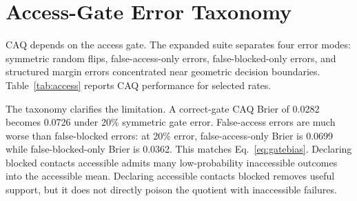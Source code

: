 \documentclass{article}
\begin{document}
\section{Access-Gate Error Taxonomy}
\label{sec:access}

CAQ depends on the access gate. The expanded suite separates four error modes: symmetric random flips, false-access-only errors, false-blocked-only errors, and structured margin errors concentrated near geometric decision boundaries. Table~\ref{tab:access} reports CAQ performance for selected rates.

\begin{table}[t]
\centering
\caption{Access-certificate errors for CAQ over 20 seeds. False-access errors are more damaging than false-blocked errors because inaccessible low-probability outcomes are incorrectly admitted into the quotient.}
\label{tab:access}
\end{table}

The taxonomy clarifies the limitation. A correct-gate CAQ Brier of 0.0282 becomes 0.0726 under 20\% symmetric gate error. False-access errors are much worse than false-blocked errors: at 20\% error, false-access-only Brier is 0.0699 while false-blocked-only Brier is 0.0362. This matches Eq.~\ref{eq:gatebias}. Declaring blocked contacts accessible admits many low-probability inaccessible outcomes into the accessible mean. Declaring accessible contacts blocked removes useful support, but it does not directly poison the quotient with inaccessible failures.
\end{document}
